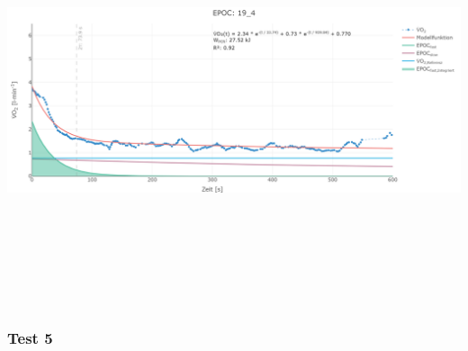 \documentclass[
  letterpaper,
  DIV=11]{scrartcl}
\begin{document}
\includegraphics[width=11.45833in,height=4.6875in]{images/19_4.png}

\subsubsection{Test 5}
\end{document}
